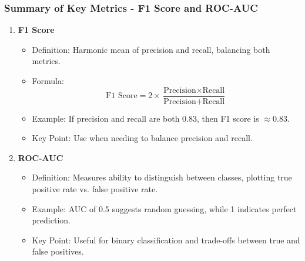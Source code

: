 \documentclass[aspectratio=169]{beamer}
\begin{document}
\begin{frame}[fragile]
    \frametitle{Summary of Key Metrics - F1 Score and ROC-AUC}
    \begin{enumerate}[resume]
        \item \textbf{F1 Score}
            \begin{itemize}
                \item Definition: Harmonic mean of precision and recall, balancing both metrics.
                \item Formula: 
                \[
                \text{F1 Score} = 2 \times \frac{\text{Precision} \times \text{Recall}}{\text{Precision} + \text{Recall}}
                \]
                \item Example: If precision and recall are both 0.83, then F1 score is \( \approx 0.83 \).
                \item Key Point: Use when needing to balance precision and recall.
            \end{itemize}

        \item \textbf{ROC-AUC}
            \begin{itemize}
                \item Definition: Measures ability to distinguish between classes, plotting true positive rate vs. false positive rate.
                \item Example: AUC of 0.5 suggests random guessing, while 1 indicates perfect prediction.
                \item Key Point: Useful for binary classification and trade-offs between true and false positives.
            \end{itemize}
    \end{enumerate}
\end{frame}
\end{document}
